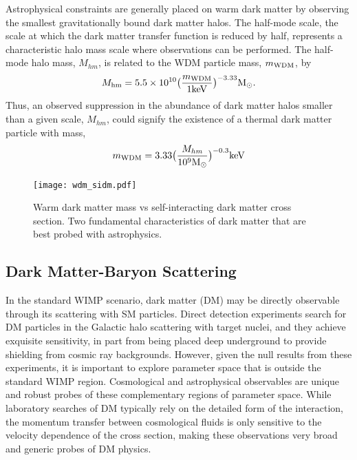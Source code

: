 Astrophysical constraints are generally placed on warm dark matter by observing the smallest gravitationally bound dark matter halos.  The half-mode scale, the scale at which the dark matter transfer function is reduced by half, represents a characteristic halo mass scale where observations can be performed. 
The half-mode halo mass, $M_{hm}$, is related to the WDM particle mass, $m_{\rm WDM}$, by \citep{Bullock:2017xww}
\begin{equation}
    M_{\rm hm} = 5.5 \times 10^{10} \big ( \frac{m_{\rm WDM}}{1 {\rm keV}} \big)^{-3.33} {\rm M_\odot}.
\end{equation}
Thus, an observed suppression in the abundance of dark matter halos smaller than a given scale, $M_{hm}$, could signify the existence of a thermal dark matter particle with mass,
\begin{equation}
    m_{\rm WDM} =  3.33 \big ( \frac{M_{hm}}{10^{9} {\rm M_\odot}} \big)^{-0.3} {\rm keV}
\end{equation}

\begin{figure}
\centering
\texttt{[image: wdm\_sidm.pdf]}
\caption{Warm dark matter mass vs self-interacting dark matter cross section. Two fundamental characteristics of dark matter that are best probed with astrophysics. }
\end{figure}

\subsection{Dark Matter-Baryon Scattering }
\label{sec:dmbaryon}
In the standard WIMP scenario, dark matter (DM) may be directly observable through its scattering with SM particles.
Direct detection experiments search for DM particles in the Galactic halo scattering with target nuclei, and they achieve exquisite sensitivity, in part from being placed deep underground to provide shielding from cosmic ray backgrounds.
However, given the null results from these experiments, it is important to explore parameter space that is outside the standard WIMP region.
Cosmological and astrophysical observables are unique and robust probes of these complementary regions of parameter space. 
While laboratory searches of DM typically rely on the detailed form of the interaction, the momentum transfer between cosmological fluids is only sensitive to the velocity dependence of the cross section, making these observations very broad and generic probes of DM physics.

